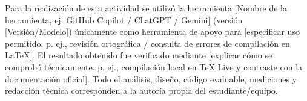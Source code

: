 \documentclass[11pt,a4paper]{article}
\begin{document}

Para la realización de esta actividad se utilizó la herramienta [Nombre de la herramienta, ej. GitHub Copilot / ChatGPT / Gemini] (versión [Versión/Modelo]) únicamente como herramienta de apoyo para [especificar uso permitido: p. ej., revisión ortográfica / consulta de errores de compilación en LaTeX]. El resultado obtenido fue verificado mediante [explicar cómo se comprobó técnicamente, p. ej., compilación local en TeX Live y contraste con la documentación oficial]. Todo el análisis, diseño, código evaluable, mediciones y redacción técnica corresponden a la autoría propia del estudiante/equipo.

\printbibliography[title={Referencias}]
\end{document}

